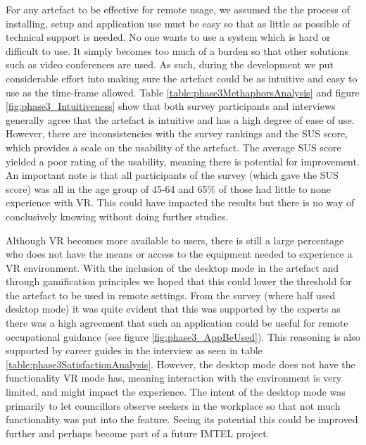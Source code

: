 For any artefact to be effective for remote usage, we assumed the the process of installing, setup and application use must be easy so that as little as possible of technical support is needed. No one wants to use a system which is hard or difficult to use. It simply becomes too much of a burden so that other solutions such as video conferences are used. As such, during the development we put considerable effort into making sure the artefact could be as intuitive and easy to use as the time-frame allowed. Table \ref{table:phase3MethaphorsAnalysis} and figure \ref{fig:phase3_Intuitiveness} show that both survey participants and interviews generally agree that the artefact is intuitive and has a high degree of ease of use. However, there are inconsistencies with the survey rankings and the SUS score, which provides a scale on the usability of the artefact. The average  SUS score yielded a poor rating of the usability, meaning there is potential for improvement. An important note is that all participants of the survey (which gave the SUS score) was all in the age group of 45-64 and 65\% of those had little to none experience with VR. This could have impacted the results but there is no way of conclusively knowing without doing further studies.  

Although VR becomes more available to users, there is still a large percentage who does not have the means or access to the equipment needed to experience a VR environment. With the inclusion of the desktop mode in the artefact and through gamification principles we hoped that this could lower the threshold for the artefact to be used in remote settings. From the survey (where half used desktop mode) it was quite evident that this was supported by the experts as there was a high agreement that such an application could be useful for remote occupational guidance (see figure \ref{fig:phase3_AppBeUsed}). This reasoning is also supported by career guides in the interview as seen in table \ref{table:phase3SatisfactionAnalysis}. However, the desktop mode does not have the functionality VR mode has, meaning interaction with the environment is very limited, and might impact the experience. The intent of the desktop mode was primarily to let councillors observe seekers in the workplace so that not much functionality was put into the feature. Seeing its potential this could be improved further and perhaps become part of a future IMTEL project. 


